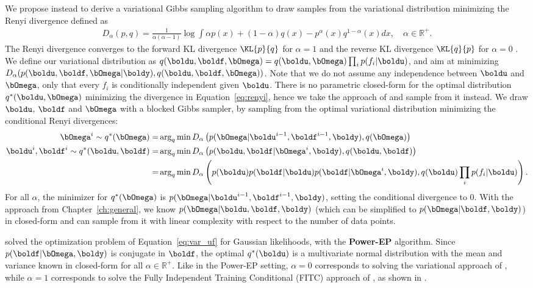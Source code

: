 We propose instead to derive a variational Gibbs sampling algorithm to draw samples from the variational distribution minimizing the Renyi divergence \cite{van2014renyi} defined as
\begin{align}
    D_\alpha(p,q) = \frac{1}{\alpha(\alpha - 1)}\log\int \alpha p(x) + (1-\alpha)q(x) - p^\alpha(x)q^{1-\alpha}(x)dx,\quad \alpha \in \mathbb{R}^+.\label{eq:renyi}
\end{align}
The Renyi divergence converges to the forward KL divergence $\KL{p}{q}$ for $\alpha=1$ and the reverse KL divergence $\KL{q}{p}$ for $\alpha=0$ \cite{van2014renyi}.
We define our variational distribution as $q(\boldu,\boldf,\bOmega) = q(\boldu,\bOmega)\prod_i p(f_i|\boldu)$, and aim at minimizing $D_\alpha(p(\boldu,\boldf,\bOmega|\boldy),q(\boldu,\boldf,\bOmega))$.
Note that we do not assume any independence between $\boldu$ and $\bOmega$, only that every $f_i$ is conditionally independent given $\boldu$.
There is no parametric closed-form for the optimal distribution $q^*(\boldu,\bOmega)$ minimizing the divergence in Equation~\eqref{eq:renyi}, hence we take the approach of \citet{hensmanMCMCVariationallySparse2015} and sample from it instead.
We draw $\boldu$, $\boldf$ and $\bOmega$ with a blocked Gibbs sampler, by sampling from the optimal variational distribution minimizing the conditional Renyi divergences:
\begin{align}
    \bOmega^i \sim q^*(\bOmega) =& \arg_q \min D_\alpha\left(p(\bOmega|\boldu^{i-1},\boldf^{i-1},\boldy),q(\bOmega)\right)\label{eq:var_omega}\\
    \boldu^i, \boldf^i \sim q^*(\boldu,\boldf) =& \arg_q \min D_\alpha\left(p(\boldu,\boldf|\bOmega^i,\boldy),q(\boldu,\boldf)\right)\nonumber\\
    =& \arg_q \min D_\alpha\left(p(\boldu)p(\boldf|\boldu)p(\boldf|\bOmega^i,\boldy),q(\boldu)\prod_i p(f_i|\boldu)\right).\label{eq:var_uf}
\end{align}
For all $\alpha$, the minimizer for $q^*(\bOmega)$ is $p(\bOmega|\boldu^{i-1},\boldf^{i-1},\boldy)$, setting the conditional divergence to 0.
With the approach from Chapter~\ref{ch:general}, we know $p(\bOmega|\boldu,\boldf,\boldy)$ (which can be simplified to $p(\bOmega|\boldf,\boldy)$) in closed-form and can sample from it with linear complexity with respect to the number of data points.

\citet{buiUnifyingFrameworkGaussian2017} solved the optimization problem of Equation~\eqref{eq:var_uf} for Gaussian likelihoods, with the \textbf{Power-EP} algorithm.
Since $p(\boldf|\bOmega,\boldy)$ is conjugate in $\boldf$, the optimal $q^*(\boldu)$ is a multivariate normal distribution with the mean and variance known in closed-form for all $\alpha \in \mathbb{R}^+$. 
Like in the Power-EP setting, $\alpha=0$ corresponds to solving the variational approach of \citet{Titsias2009}, while $\alpha=1$ corresponds to solve the Fully Independent Training Conditional (FITC) approach of \citet{snelsonSparseGaussianProcesses2009}, as shown in \citet{buiUnifyingFrameworkGaussian2017}.

